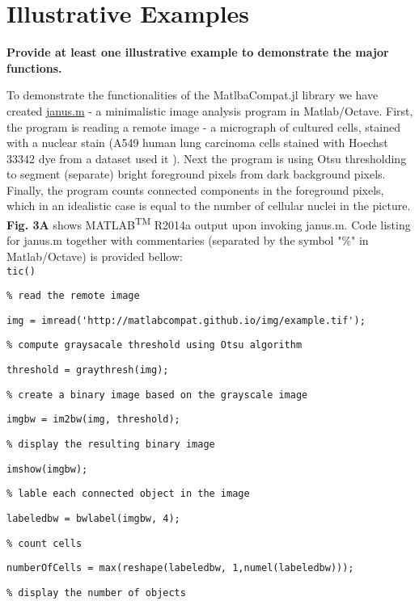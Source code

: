 \section{Illustrative Examples}
\label{} 

\textbf{Provide at least one illustrative example to demonstrate the major functions.}

To demonstrate the functionalities of the MatlbaCompat.jl library we have created \href{https://github.com/MatlabCompat/MatlabCompat.jl/blob/dev/test/janus.m}{janus.m} - a minimalistic image analysis program in Matlab/Octave. First, the program is reading a remote image - a micrograph of cultured cells, stained with a nuclear stain (A549 human lung carcinoma cells stained with Hoechst 33342 dye from a dataset used it \cite{22787215}). Next the program is using Otsu \cite{otsu1975threshold} thresholding to segment (separate) bright foreground pixels from dark background pixels. Finally, the program counts connected components in the foreground pixels, which in an idealistic case is equal to the number of cellular nuclei in the picture. \textbf{Fig. 3A} shows MATLAB\textsuperscript{TM} R2014a output upon invoking janus.m. Code listing for janus.m together with commentaries (separated by the symbol "\%" in Matlab/Octave) is provided bellow:\\



\verb|tic()|

\verb|% read the remote image|

\verb|img = imread('http://matlabcompat.github.io/img/example.tif');|

\verb|% compute graysacale threshold using Otsu algorithm|

\verb|threshold = graythresh(img);|

\verb|% create a binary image based on the grayscale image|

\verb|imgbw = im2bw(img, threshold);|

\verb|% display the resulting binary image|

\verb|imshow(imgbw);|

\verb|% lable each connected object in the image|

\verb|labeledbw = bwlabel(imgbw, 4);|

\verb|% count cells|

\verb|numberOfCells = max(reshape(labeledbw, 1,numel(labeledbw)));|

\verb|% display the number of objects|

